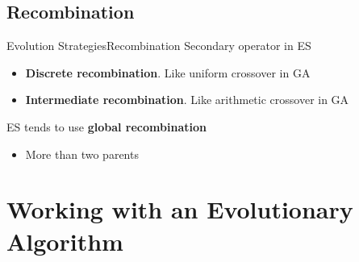 \documentclass[10pt,compress]{beamer} %
\begin{document}
\subsection{Recombination}
\begin{frame}{Evolution Strategies}{Recombination}
	Secondary operator in ES
	\begin{itemize}
		\item \textbf{Discrete recombination}. Like uniform crossover in GA
		\item \textbf{Intermediate recombination}. Like arithmetic crossover in GA
	\end{itemize}
	ES tends to use \textbf{global recombination}
	\begin{itemize}
		\item More than two parents
	\end{itemize}
\end{frame}


\section{Working with an Evolutionary Algorithm}
\end{document}
